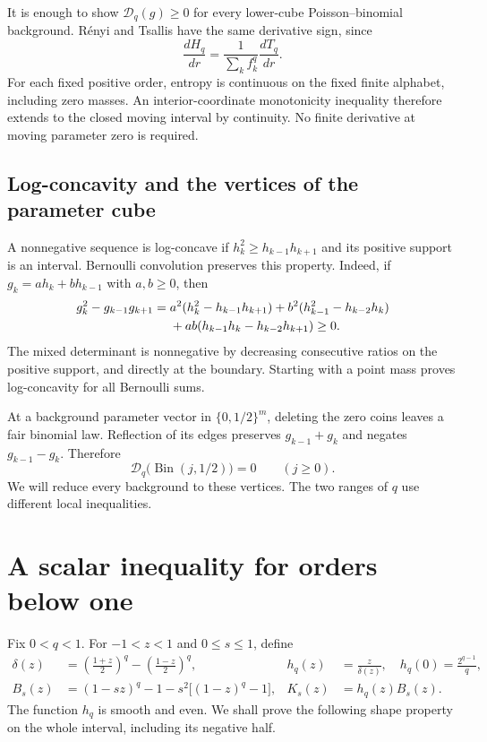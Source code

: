 \documentclass[11pt,a4paper]{amsart}
\numberwithin{equation}{section}
\theoremstyle{remark}
\newcommand{\Bin}{\operatorname{Bin}}
\newcommand{\D}{\mathscr D}
\begin{document}
It is enough to show $\D_q(g)\ge0$ for every lower-cube
Poisson--binomial background. R\'enyi and Tsallis have the same
derivative sign, since
\begin{equation}
\frac{dH_q}{dr}=\frac{1}{\sum_k f_k^q}\frac{dT_q}{dr}.
\label{eq:renyisign}
\end{equation}
For each fixed positive order, entropy is continuous on the fixed
finite alphabet, including zero masses. An interior-coordinate
monotonicity inequality therefore extends to the closed moving
interval by continuity. No finite derivative at moving parameter
zero is required.

\subsection{Log-concavity and the vertices of the parameter cube}

A nonnegative sequence is log-concave if $h_k^2\ge h_{k-1}h_{k+1}$ and its positive
support is an interval. Bernoulli convolution preserves this property.
Indeed, if $g_k=a h_k+b h_{k-1}$ with $a,b\ge0$, then
\begin{align}
g_k^2-g_{k-1}g_{k+1}
={}&a^2(h_k^2-h_{k-1}h_{k+1})
 +b^2(h_{k-1}^2-h_{k-2}h_k)\notag\\
&+ab(h_{k-1}h_k-h_{k-2}h_{k+1})\ge0.
\label{eq:LCconvolution}
\end{align}
The mixed determinant is nonnegative by decreasing consecutive ratios
on the positive support, and directly at the boundary. Starting with a
point mass proves log-concavity for all Bernoulli sums.

At a background parameter vector in $\{0,1/2\}^m$, deleting the zero
coins leaves a fair binomial law. Reflection of its edges preserves
$g_{k-1}+g_k$ and negates $g_{k-1}-g_k$. Therefore
\begin{equation}
\D_q\bigl(\Bin(j,1/2)\bigr)=0\qquad(j\ge0).
\label{eq:vertices}
\end{equation}
We will reduce every background to these vertices. The two ranges of
$q$ use different local inequalities.

\section{A scalar inequality for orders below one}
\label{sec:scalar}

Fix $0<q<1$. For $-1<z<1$ and $0\le s\le1$, define
\begin{align}
 \delta(z)&=\left(\frac{1+z}{2}\right)^q
             -\left(\frac{1-z}{2}\right)^q,
 &h_q(z)&=\frac{z}{\delta(z)},\quad h_q(0)=\frac{2^{q-1}}q,
 \label{eq:delta}\\
 B_s(z)&=(1-sz)^q-1-s^2\bigl[(1-z)^q-1\bigr],
 &K_s(z)&=h_q(z)B_s(z).
 \label{eq:scalarK}
\end{align}
The function $h_q$ is smooth and even. We shall prove the following
shape property on the whole interval, including its negative half.
\end{document}
